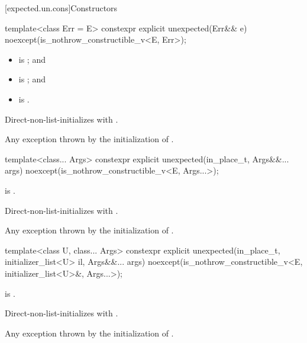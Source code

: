 [expected.un.cons]{Constructors}

%
\begin{itemdecl}
template<class Err = E>
  constexpr explicit unexpected(Err&& e) noexcept(is_nothrow_constructible_v<E, Err>);
\end{itemdecl}

\begin{itemdescr}
\pnum
\constraints
\begin{itemize}
\item {} is ; and
\item {} is ; and
\item {} is .
\end{itemize}

\pnum
\effects
Direct-non-list-initializes  with .

\pnum
\throws
Any exception thrown by the initialization of .
\end{itemdescr}

%
\begin{itemdecl}
template<class... Args>
  constexpr explicit unexpected(in_place_t, Args&&... args) noexcept(is_nothrow_constructible_v<E, Args...>);
\end{itemdecl}

\begin{itemdescr}
\pnum
\constraints
{} is .

\pnum
\effects
Direct-non-list-initializes  with .

\pnum
\throws
Any exception thrown by the initialization of .
\end{itemdescr}

%
\begin{itemdecl}
template<class U, class... Args>
  constexpr explicit unexpected(in_place_t, initializer_list<U> il,
                                Args&&... args) noexcept(is_nothrow_constructible_v<E, initializer_list<U>&, Args...>);
\end{itemdecl}

\begin{itemdescr}
\pnum
\constraints
{} is .

\pnum
\effects
Direct-non-list-initializes  with .

\pnum
\throws
Any exception thrown by the initialization of .
\end{itemdescr}

